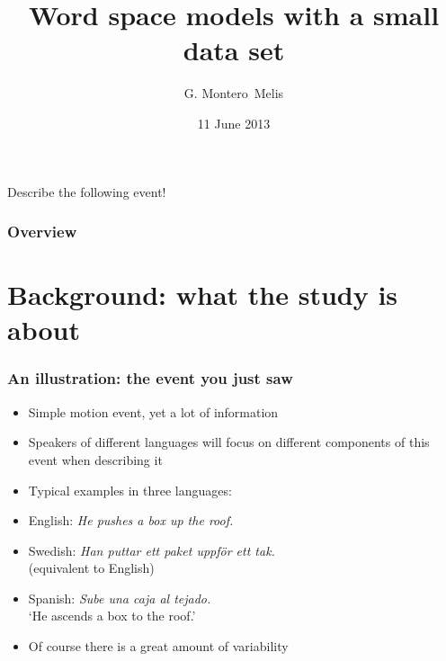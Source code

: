 \documentclass[]{beamer}
\title{
Word space models with a small data set
}
\author{G. Montero~Melis}
\institute{Centre for Research on Bilingualism \\Stockholm University}
\date{11 June 2013}
\begin{document}


\begin{frame}[fragile]
	\maketitle
\end{frame}


\begin{frame}
	Describe the following event!
\end{frame}

\begin{frame}
\end{frame}

\begin{frame}
	\frametitle{Overview}
	\tableofcontents
\end{frame}


\section{Background: what the study is about}


\begin{frame}
	\frametitle{An illustration: the event you just saw}
	\begin{itemize}
	\item Simple motion event, yet a lot of information
	\item Speakers of different languages will focus on different components of this event when describing it
	\item Typical examples in three languages: \pause
	\item English: \emph{He \alert{pushes} a box \alert{up} the roof.} \pause
	\item Swedish: \emph{Han \alert{puttar} ett paket \alert{uppf\"{o}r} ett tak.} 
		\\(equivalent to English)\pause
	\item Spanish: \emph{\alert{Sube} una caja al tejado.}
		\\`He ascends a box to the roof.'\pause
	 \item Of course there is a great amount of variability
	\end{itemize}
\end{frame}
\end{document}
